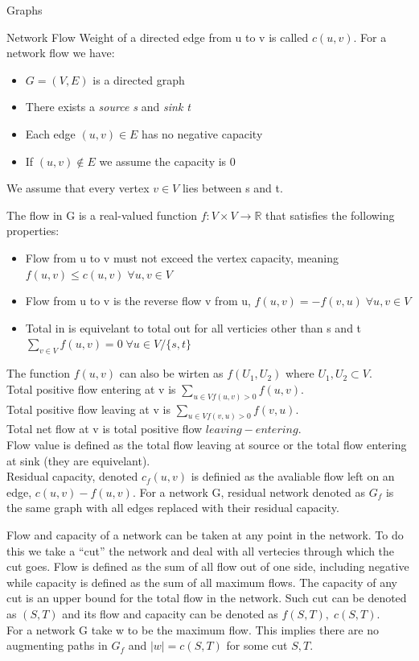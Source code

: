 \documentclass[12pt, letterpaper]{article}
\begin{document}
\begin{section}{Graphs}
  \begin{subsection}{Network Flow}
    Weight of a directed edge from u to v is called \(c(u, v)\).
    For a network flow we have:
    \begin{itemize}
      \item \(G = (V, E)\) is a directed graph
      \item There exists a \emph{source s} and \emph{sink t}
      \item Each edge \((u, v) \in E\) has no negative capacity
      \item If \((u, v) \notin E\) we assume the capacity is 0
    \end{itemize}
    We assume that every vertex \(v \in V\) lies between s and t.

    The flow in G is a real-valued function \(f: V \times V \to \mathbb{R}\)
    that satisfies the following properties:
    \begin{itemize}
      \item Flow from u to v must not exceed the vertex capacity, meaning
            \(f(u, v) \leq c(u, v) \; \forall u, v \in V\)
      \item Flow from u to v is the reverse flow v from u,
            \(f(u, v) = -f(v, u) \; \forall u, v \in V\)
      \item Total in is equivelant to total out for all verticies other than s and t
            \(\sum_{v \in V} f(u, v) = 0 \; \forall u \in V/\{{} s, t \}{}\)
    \end{itemize}
    The function \(f(u, v)\) can also be wirten as \(f(U_{1}, U_{2})\) where
    \(U_{1}, U_{2} \subset V\). \\
    Total positive flow entering at v is \(\sum_{u \in V f(u, v) > 0} f(u, v)\). \\
    Total positive flow leaving at v is \(\sum_{u \in V f(v, u) > 0} f(v, u)\). \\
    Total net flow at v is total positive flow \(leaving - entering\). \\
    Flow value is defined as the total flow leaving at source or the total
    flow entering at sink (they are equivelant). \\
    Residual capacity, denoted \(c_{f}(u, v)\) is definied as the avaliable flow
    left on an edge, \(c(u, v) - f(u, v)\). For a network G, residual network denoted as \(G_{f}\)
    is the same graph with all edges replaced with their residual capacity.

    Flow and capacity of a network can be taken at any point in the network.
    To do this we take a ``cut'' the network and deal with all vertecies through
    which the cut goes. Flow is defined as the sum of all flow out of one side, including
    negative while capacity is defined as the sum of all maximum flows. The capacity of any
    cut is an upper bound for the total flow in the network. Such cut can be denoted
    as \((S, T)\) and its flow and capacity can be denoted as \(f(S, T), \; c(S, T)\). \\
    For a network G take w to be the maximum flow. This implies there are no
    augmenting paths in \(G_{f}\) and \(|w| = c(S, T)\) for some cut \(S, T\).


\end{subsection}
\end{section}
\end{document}
